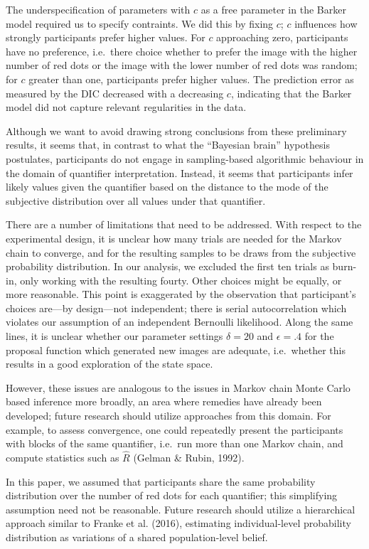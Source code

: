 \documentclass[english,floatsintext,man]{apa6}
\begin{document}
The underspecification of parameters with \(c\) as a free parameter in
the Barker model required us to specify contraints. We did this by
fixing \(c\); \(c\) influences how strongly participants prefer higher
values. For \(c\) approaching zero, participants have no preference,
i.e.~there choice whether to prefer the image with the higher number of
red dots or the image with the lower number of red dots was random; for
\(c\) greater than one, participants prefer higher values. The
prediction error as measured by the DIC decreased with a decreasing
\(c\), indicating that the Barker model did not capture relevant
regularities in the data.

Although we want to avoid drawing strong conclusions from these
preliminary results, it seems that, in contrast to what the
\enquote{Bayesian brain} hypothesis postulates, participants do not
engage in sampling-based algorithmic behaviour in the domain of
quantifier interpretation. Instead, it seems that participants infer
likely values given the quantifier based on the distance to the mode of
the subjective distribution over all values under that quantifier.

There are a number of limitations that need to be addressed. With
respect to the experimental design, it is unclear how many trials are
needed for the Markov chain to converge, and for the resulting samples
to be draws from the subjective probability distribution. In our
analysis, we excluded the first ten trials as burn-in, only working with
the resulting fourty. Other choices might be equally, or more
reasonable. This point is exaggerated by the observation that
participant's choices are---by design---not independent; there is serial
autocorrelation which violates our assumption of an independent
Bernoulli likelihood. Along the same lines, it is unclear whether our
parameter settings \(\delta = 20\) and \(\epsilon = .4\) for the
proposal function which generated new images are adequate, i.e.~whether
this results in a good exploration of the state space.

However, these issues are analogous to the issues in Markov chain Monte
Carlo based inference more broadly, an area where remedies have already
been developed; future research should utilize approaches from this
domain. For example, to assess convergence, one could repeatedly present
the participants with blocks of the same quantifier, i.e.~run more than
one Markov chain, and compute statistics such as \(\hat R\) (Gelman \&
Rubin, 1992).

In this paper, we assumed that participants share the same probability
distribution over the number of red dots for each quantifier; this
simplifying assumption need not be reasonable. Future research should
utilize a hierarchical approach similar to Franke et al. (2016),
estimating individual-level probability distribution as variations of a
shared population-level belief.
\end{document}
